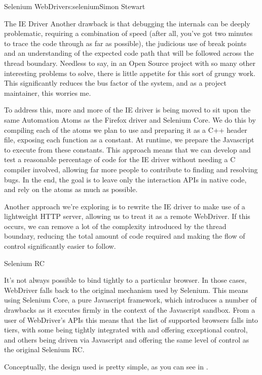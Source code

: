 \begin{aosachapter}{Selenium WebDriver}{s:selenium}{Simon Stewart}
\begin{aosasect1}{The IE Driver}
Another drawback is that debugging the internals can be deeply
problematic, requiring a combination of speed (after all, you've got
two minutes to trace the code through as far as possible), the
judicious use of break points and an understanding of the expected
code path that will be followed across the thread boundary. Needless
to say, in an Open Source project with so many other interesting
problems to solve, there is little appetite for this sort of grungy
work. This significantly reduces the bus factor of the system, and as
a project maintainer, this worries me.

To address this, more and more of the IE driver is being moved to sit
upon the same Automation Atoms as the Firefox driver and Selenium
Core. We do this by compiling each of the atoms we plan to use and
preparing it as a C++ header file, exposing each function as a
constant. At runtime, we prepare the Javascript to execute from these
constants. This approach means that we can develop and test a
reasonable percentage of code for the IE driver without needing a C
compiler involved, allowing far more people to contribute to finding
and resolving bugs. In the end, the goal is to leave only the
interaction APIs in native code, and rely on the atoms as much as
possible.

Another approach we're exploring is to rewrite the IE driver to make
use of a lightweight HTTP server, allowing us to treat it as a remote
WebDriver. If this occurs, we can remove a lot of the complexity
introduced by the thread boundary, reducing the total amount of code
required and making the flow of control significantly easier to
follow.

\end{aosasect1}

\begin{aosasect1}{Selenium RC}

It's not always possible to bind tightly to a particular browser. In
those cases, WebDriver falls back to the original mechanism used by
Selenium. This means using Selenium Core, a pure Javascript framework,
which introduces a number of drawbacks as it executes firmly in the
context of the Javascript sandbox. From a user of WebDriver's APIs
this means that the list of supported browsers falls into tiers, with
some being tightly integrated with and offering exceptional control,
and others being driven via Javascript and offering the same level of
control as the original Selenium RC.

Conceptually, the design used is pretty simple, as you can see in
.


\end{aosasect1}
\end{aosachapter}
